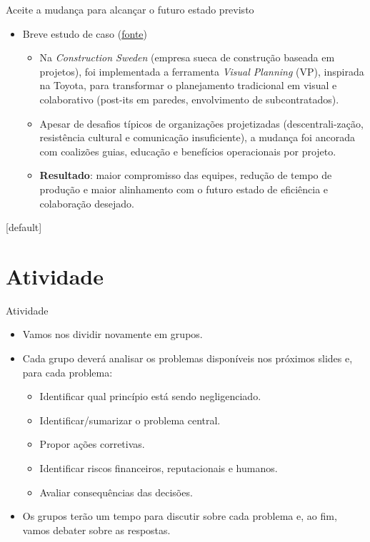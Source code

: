 \documentclass{beamer}
\begin{document}
\begin{frame}{Aceite a mudança para alcançar o futuro estado previsto}
	\begin{itemize}
		\justifying
		\item Breve estudo de caso (\href{https://www.pmi.org/learning/library/project-based-organizations-change-management-6471}{fonte})
		\begin{itemize}
			\justifying
			\item<1-> Na \textit{Construction Sweden} (empresa sueca de construção baseada em projetos), foi implementada a ferramenta \textit{Visual Planning} (VP), inspirada na Toyota, para transformar o planejamento tradicional em visual e colaborativo (post-its em paredes, envolvimento de subcontratados).
			\item<2-> Apesar de desafios típicos de organizações projetizadas (descentrali-zação, resistência cultural e comunicação insuficiente), a mudança foi ancorada com coalizões guias, educação e benefícios operacionais por projeto.
			\item<3> \textbf{Resultado}: maior compromisso das equipes, redução de tempo de produção e maior alinhamento com o futuro estado de eficiência e colaboração desejado.
		\end{itemize}
	\end{itemize}
\end{frame}

[default]


\section{Atividade}

\begin{frame}{Atividade}
    \begin{itemize}
        \justifying
        \item Vamos nos dividir novamente em grupos.
        \item Cada grupo deverá analisar os problemas disponíveis nos próximos slides e, para cada problema:
        \begin{itemize}
        	\justifying
        	\item Identificar qual princípio está sendo negligenciado.
        	\item Identificar/sumarizar o problema central.
        	\item Propor ações corretivas.
        	\item Identificar riscos financeiros, reputacionais e humanos.
        	\item Avaliar consequências das decisões.
        \end{itemize}
        \item Os grupos terão um tempo para discutir sobre cada problema e, ao fim, vamos debater sobre as respostas.
    \end{itemize}
\end{frame}
\end{document}
